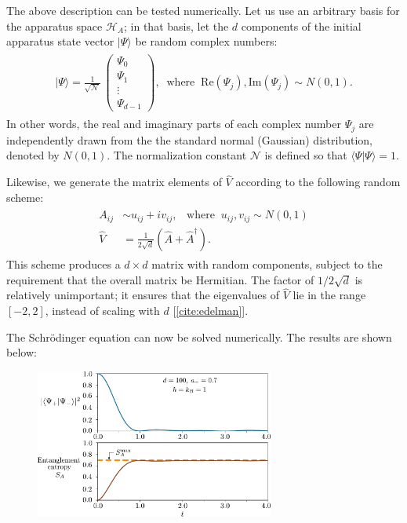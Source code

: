 \documentclass[pra,12pt]{revtex4-2}
\begin{document}
The above description can be tested numerically.  Let us use an
arbitrary basis for the apparatus space $\mathscr{H}_A$; in that
basis, let the $d$ components of the initial apparatus state vector
$|\Psi\rangle$ be random complex numbers:
\begin{align}
  \begin{aligned}
  |\Psi\rangle = \frac{1}{\sqrt{\mathcal{N}}}\, \begin{pmatrix}\Psi_0 \\ \Psi_1 \\ \vdots \\ \Psi_{d-1}
  \end{pmatrix}, \;\; \mathrm{where} \;\; \mathrm{Re}(\Psi_j), \mathrm{Im}(\Psi_j) \sim N(0,1).
  \end{aligned}
\end{align}
In other words, the real and imaginary parts of each complex number
$\Psi_j$ are independently drawn from the the standard normal
(Gaussian) distribution, denoted by $N(0,1)$.  The normalization
constant $\mathcal{N}$ is defined so that $\langle\Psi|\Psi\rangle =
1$.

Likewise, we generate the matrix elements of $\hat{V}$ according to
the following random scheme:
\begin{align}
  \begin{aligned}A_{ij} &\sim u_{ij} + i v_{ij}, \;\;\;\mathrm{where}\;\;u_{ij},v_{ij}\sim N(0,1)\\ \hat{V} &= \frac{1}{2\sqrt{d}} \left(\hat{A} + \hat{A}^\dagger\right).\end{aligned}
\end{align}
This scheme produces a $d\times d$ matrix with random components,
subject to the requirement that the overall matrix be Hermitian.  The
factor of $1/2\sqrt{d}$ is relatively unimportant; it ensures that the
eigenvalues of $\hat{V}$ lie in the range $[-2,2]$, instead of scaling
with $d$ [\ref{cite:edelman}].

The Schr\"odinger equation can now be solved numerically.  The results
are shown below:

\begin{figure}[h]
  \centering\includegraphics[width=0.7\textwidth]{decoherence}
\end{figure}
\end{document}
